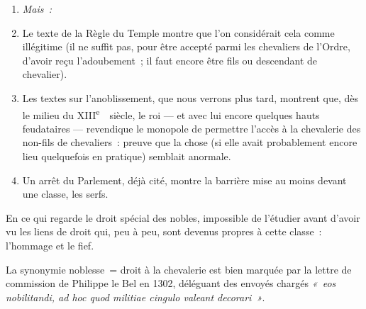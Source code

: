 \documentclass[french,twoside]{book} %
\newlength{\listmod}
\newcommand{\listhead}[1]{\hspace{-1\listmod}\emph{#1}}
\begin{document}
\begin{enumerate}[itemsep=0pt,]
\item[]\listhead{Mais :}
\item  {}
\label{p65} Le texte de la Règle du Temple montre que l’on considérait cela comme illégitime (il ne suffit pas, pour être accepté parmi les chevaliers de l’Ordre, d’avoir reçu l’adoubement ; il faut encore être fils ou descendant de chevalier).
\item Les textes sur l’anoblissement, que nous verrons plus tard, montrent que, dès le milieu du XIII\textsuperscript{e}  siècle, le roi — et avec lui encore quelques hauts feudataires — revendique le monopole de permettre l’accès à la chevalerie des non-fils de chevaliers : preuve que la chose (si elle avait probablement encore lieu quelquefois en pratique) semblait anormale.
\item Un arrêt du Parlement, déjà cité, montre la barrière mise au moins devant une classe, les serfs.
\end{enumerate}

\noindent En ce qui regarde le droit spécial des nobles, impossible de l’étudier avant d’avoir vu les liens de droit qui, peu à peu, sont devenus propres à cette classe : l’hommage et le fief.\par
La synonymie noblesse = droit à la chevalerie est bien marquée par la lettre de commission de Philippe le Bel en 1302, déléguant des envoyés chargés \emph{« eos nobilitandi, ad hoc quod militiae cingulo valeant decorari »}.
\end{document}
